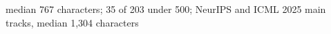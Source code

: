 median 767 characters; 35 of 203 under 500; NeurIPS and ICML 2025 main tracks, median 1,304 characters